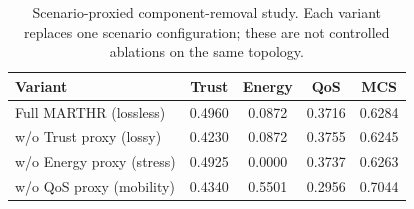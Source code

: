 \begin{table}[t]
\centering
\caption{Scenario-proxied component-removal study. Each variant replaces one scenario configuration; these are not controlled ablations on the same topology.}
\label{tab:ablation}
\begin{tabular}{lcccc}
\toprule
Variant & Trust & Energy & QoS & MCS \\
\midrule
Full MARTHR (lossless) & 0.4960 & 0.0872 & 0.3716 & 0.6284 \\ 
w/o Trust proxy (lossy) & 0.4230 & 0.0872 & 0.3755 & 0.6245 \\ 
w/o Energy proxy (stress) & 0.4925 & 0.0000 & 0.3737 & 0.6263 \\ 
w/o QoS proxy (mobility) & 0.4340 & 0.5501 & 0.2956 & 0.7044 \\ 
\bottomrule
\end{tabular}
\end{table}
